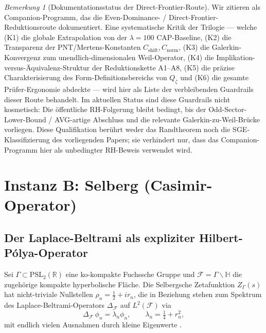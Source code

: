 \documentclass[11pt]{article}
\theoremstyle{definition}
\theoremstyle{remark}
\newtheorem{remark}[theorem]{Bemerkung}
\newcommand{\PSL}{\mathrm{PSL}}
\newcommand{\halfline}{\tfrac{1}{2}}
\begin{document}
\begin{remark}[Dokumentationsstatus der Direct-Frontier-Route]
\label{rem:riemann-critique-review}
Wir zitieren \cite{Geiger2026RHII} als Companion-Programm, das die
Even-Dominance- / Direct-Frontier-Reduktionsroute dokumentiert. Eine
systematische Kritik der Trilogie
\cite{Geiger2026RHII,Geiger2026RHIII} --- welche (K1) die globale
Extrapolation von der $\lambda = 100$ CAP-Baseline, (K2) die Transparenz
der PNT/Mertens-Konstanten $C_{\mathrm{shift}}, C_{\mathrm{norm}}$, (K3)
die Galerkin-Konvergenz zum unendlich-dimensionalen Weil-Operator, (K4)
die Implikation-versus-Äquivalenz-Struktur der Reduktionskette A1--A8,
(K5) die präzise Charakterisierung des Form-Definitionsbereichs von
$Q_\zeta$ und (K6) die gesamte Prüfer-Ergonomie abdeckte --- wird hier
als Liste der verbleibenden Guardrails dieser Route behandelt. Im
aktuellen Status sind diese Guardrails nicht kosmetisch: Die öffentliche
RH-Folgerung bleibt bedingt, bis der Odd-Sector-Lower-Bound /
AVG-artige Abschluss und die relevante Galerkin-zu-Weil-Brücke vorliegen.
Diese Qualifikation berührt weder das Randtheorem noch die
SGE-Klassifizierung des vorliegenden Papers; sie verhindert nur, dass das
Companion-Programm hier als unbedingter RH-Beweis verwendet wird.
\end{remark}

\section{Instanz B: Selberg (Casimir-Operator)}
\label{sec:selberg}

\subsection{Der Laplace-Beltrami als expliziter Hilbert-P\'olya-Operator}

Sei $\Gamma \subset \PSL_2(\mathbb{R})$ eine ko-kompakte Fuchssche Gruppe
und $\mathcal{F} = \Gamma\backslash\mathbb{H}$ die zugehörige kompakte
hyperbolische Fläche. Die Selbergsche Zetafunktion $Z_\Gamma(s)$ hat
nicht-triviale Nullstellen $\rho_n = \halfline + ir_n$, die in Beziehung stehen
zum Spektrum des Laplace-Beltrami-Operators $\Delta_\mathcal{F}$ auf
$L^2(\mathcal{F})$ via
\begin{equation}
\label{eq:selberg-spectral}
  \Delta_\mathcal{F}\,\phi_n = \lambda_n\phi_n, \qquad
  \lambda_n = \tfrac{1}{4} + r_n^2,
\end{equation}
mit endlich vielen Ausnahmen durch kleine Eigenwerte
\cite{Selberg1956,Marklof2008}.
\end{document}
